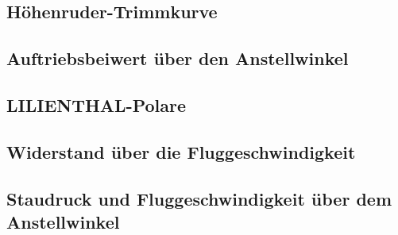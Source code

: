 	\subsection{Höhenruder-Trimmkurve}
	\subsection{Auftriebsbeiwert über den Anstellwinkel}
	\subsection{LILIENTHAL-Polare}
	\subsection{Widerstand über die Fluggeschwindigkeit}
	\subsection{Staudruck und Fluggeschwindigkeit über dem Anstellwinkel}
	\newpage
	
